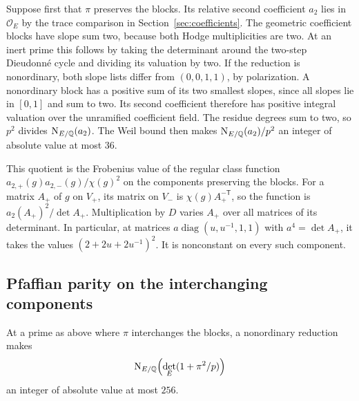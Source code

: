 Suppose first that \(\pi\) preserves the blocks. Its relative second
coefficient \(a_2\) lies in \(\mathcal O_E\) by the trace comparison in
Section~\ref{sec:coefficients}. The geometric coefficient blocks have
slope sum two, because both Hodge multiplicities are two. At an inert
prime this follows by taking the determinant around the two-step
Dieudonn\'e cycle and dividing its valuation by two. If the reduction
is nonordinary, both slope lists differ from \((0,0,1,1)\), by
polarization. A nonordinary block has a positive sum of its two
smallest slopes, since all slopes lie in \([0,1]\) and sum to two.
Its second coefficient therefore has positive integral valuation over
the unramified coefficient field. The residue degrees sum to two,
so \(p^2\) divides \(\operatorname{N}_{E/\mathbb Q}(a_2)\). The Weil bound then makes
\(\operatorname{N}_{E/\mathbb Q}(a_2)/p^2\) an integer of absolute value at most \(36\).

This quotient is the Frobenius value of the regular class function
\(a_{2,+}(g)a_{2,-}(g)/\chi(g)^2\) on the components preserving the
blocks. For a matrix \(A_+\) of \(g\) on \(V_+\), its matrix on
\(V_-\) is \(\chi(g)A_+^{-\mathsf T}\), so the function is
\(a_2(A_+)^2/\det A_+\). Multiplication by \(D\) varies \(A_+\)
over all matrices of its determinant. In particular, at matrices
\(a\operatorname{diag}(u,u^{-1},1,1)\) with \(a^4=\det A_+\), it
takes the values \((2+2u+2u^{-1})^2\). It is nonconstant on every
such component.

\subsection{Pfaffian parity on the interchanging components}

\begin{proposition}\label{prop:fourfold-pfaffian}
At a prime as above where \(\pi\) interchanges the blocks, a
nonordinary reduction makes
\[
  \operatorname{N}_{E/\mathbb Q}\!\left(\det_E(1+\pi^2/p)\right)
\]
an integer of absolute value at most \(256\).
\end{proposition}

